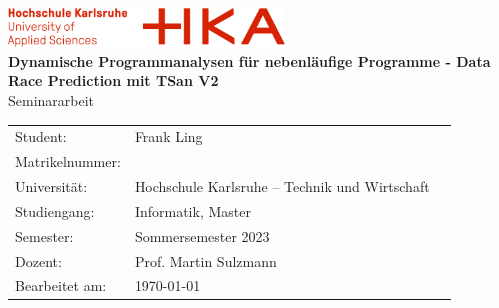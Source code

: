 \documentclass[12pt]{article}
\begin{document}
	\begin{titlepage}
		\begin{center}
			\includegraphics[width=0.55\textwidth]{images/hka-logo.png}\\[16ex]
			\LARGE{\textbf{Dynamische Programmanalysen für nebenläufige Programme - Data Race Prediction mit TSan V2}}\\[8ex]
			\Large{{Seminararbeit}}\\[14ex]
			\normalsize{}
			\begin{tabular}{lll}
				Student:            & \quad Frank Ling                                  & \\[2ex]
				Matrikelnummer:     & \quad 79496 & \\[2ex]     %
				Universität:        & \quad Hochschule Karlsruhe – Technik und Wirtschaft   &       \\[2ex]
				Studiengang:        & \quad Informatik, Master                &       \\[2ex]
				Semester:           & \quad Sommersemester 2023                             &       \\[2ex]
				Dozent:             & \quad Prof. Martin Sulzmann                       &       \\[2ex]
				Bearbeitet am:      & \quad \today                                  &       \\[2ex]
			\end{tabular}
		\end{center}
	\end{titlepage}
	\newpage
	{\hypersetup{linkcolor=black} 
	\tableofcontents}
	\newpage
\end{document}
